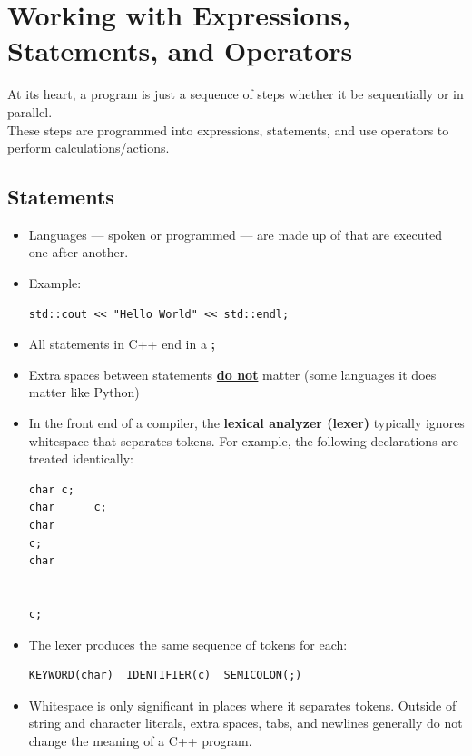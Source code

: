 \documentclass[10pt]{article}
\newcommand{\vocab}[1]{\fbox{\textbf{\textit{#1}}}}
\newcommand{\newbp}{%
  \newpage
  \mbox{}
  \newpage
}
\begin{document}
\newbp

\section{Working with Expressions, Statements, and Operators}
At its heart, a program is just a sequence of steps whether it be sequentially or in parallel.\\
These steps are programmed into expressions, statements, and use operators to perform calculations/actions.

\subsection{Statements}
\begin{itemize}
	\item Languages --- spoken or programmed --- are made up of \vocab{statements} that are executed one after another.

	\item Example:
		\begin{verbatim}
std::cout << "Hello World" << std::endl;
		\end{verbatim}

	\item All statements in C++ end in a \textbf{;}
	\item Extra spaces between statements \underline{\textbf{do not}} matter (some languages it does matter like Python)
\item In the front end of a compiler, the \textbf{lexical analyzer (lexer)} typically ignores whitespace that separates tokens. For example, the following declarations are treated identically:

\begin{verbatim}
char c;
char      c;
char
c;
char     


c;
\end{verbatim}

\item The lexer produces the same sequence of tokens for each:

\begin{verbatim}
KEYWORD(char)  IDENTIFIER(c)  SEMICOLON(;)
\end{verbatim}

\item Whitespace is only significant in places where it separates tokens. Outside of string and character literals, extra spaces, tabs, and newlines generally do not change the meaning of a C++ program.


\end{itemize}
\end{document}
